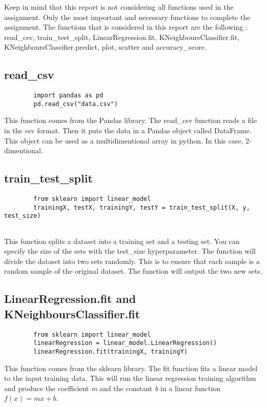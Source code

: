 \documentclass[titlepage, 11pt]{article}
\begin{document}
	Keep in mind that this report is not considering all functions used in the assignment. Only the most important and necessary functions to complete the assignment. The functions that is considered in this report are the following : read\_csv, train\_test\_split, LinearRegression.fit, KNeighboursClassifier.fit, KNeighboursClassifier.predict, plot, scatter and accuracy\_score.

	\subsection{read\_csv}
	
	\begin{lstlisting}
		import pandas as pd
		pd.read_csv("data.csv")
	\end{lstlisting}
	This function comes from the Pandas library. The read\_csv function reads a file in the csv format. Then it puts the data in a Pandas object called DataFrame. This object can be used as a multidimentional array in python. In this case, 2-dimentional.

	\subsection{train\_test\_split}
	
	\begin{lstlisting}
		from sklearn import linear_model
		trainingX, testX, trainingY, testY = train_test_split(X, y, test_size)
		
	\end{lstlisting}
	This function splits a dataset into a training set and a testing set. You can specify the size of the sets with the test\_size hyperparameter. The function will divide the dataset into two sets randomly. This is to ensure that each sample is a random sample of the original dataset. The function will output the two new sets.
	
	\subsection{LinearRegression.fit and KNeighboursClassifier.fit}
	
	\begin{lstlisting}
		from sklearn import linear_model
		linearRegression = linear_model.LinearRegression()
		linearRegression.fit(trainingX, trainingY)
	\end{lstlisting}
	This function comes from the sklearn library. The fit function fits a linear model to the input training data. This will run the linear regression training algorithm and produce the coefficient \emph{m} and the constant \emph{b} in a linear function $ f(x) = mx + b $.
	
\end{document}
